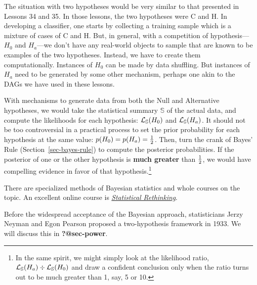 \documentclass[
  letterpaper,
  DIV=11,
  numbers=noendperiod,
  oneside]{scrreprt}
\begin{document}
The situation with two hypotheses would be very similar to that
presented in Lessons 34 and 35. In those lessons, the two hypotheses
were C and H. In developing a classifier, one starts by collecting a
training sample which is a mixture of cases of C and H. But, in general,
with a competition of hypothesis---\(H_0\) and \(H_a\)---we don't have
any real-world objects to sample that are known to be examples of the
two hypotheses. Instead, we have to create them computationally.
Instances of \(H_0\) can be made by data shuffling. But instances of
\(H_a\) need to be generated by some other mechanism, perhaps one akin
to the DAGs we have used in these lessons.

With mechanisms to generate data from both the Null and Alternative
hypotheses, we would take the statistical summary \(\mathbb{S}\) of the
actual data, and compute the likelihoods for each hypothesis:
\({\cal L}_{\mathbb{S}}(H_0)\) and \({\cal L}_{\mathbb{S}}(H_a)\). It
should not be too controversial in a practical process to set the prior
probability for each hypothesis at the same value:
\(p(H_0) = p(H_a) = {\small \frac{1}{2}}\). Then, turn the crank of
Bayes' Rule (Section~\ref{sec-bayes-rule}) to compute the posterior
probabilities. If the posterior of one or the other hypothesis is
\textbf{much greater} than \({\small \frac{1}{2}}\), we would have
compelling evidence in favor of that hypothesis.\footnote{In the same
  spirit, we might simply look at the likelihood ratio,
  \({\cal L}_{\mathbb{S}}(H_a) \div {\cal L}_{\mathbb{S}}(H_0)\) and
  draw a confident conclusion only when the ratio turns out to be much
  greater than 1, say, 5 or 10.}

There are specialized methods of Bayesian statistics and whole courses
on the topic. An excellent online course is
\href{https://www.youtube.com/channel/UCNJK6_DZvcMqNSzQdEkzvzA}{\emph{Statistical
Rethinking}}.

Before the widespread acceptance of the Bayesian approach, statisticians
Jerzy Neyman and Egon Pearson proposed a two-hypothesis framework in
1933. We will discuss this in \textbf{?@sec-power}.
\end{document}
